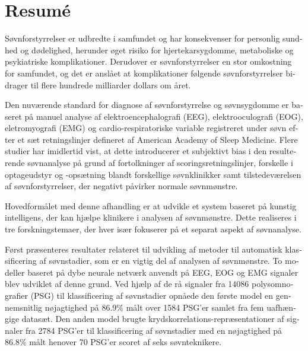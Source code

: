 \begingroup
\let\clearpage\relax
\let\cleardoublepage\relax
\let\cleardoublepage\relax

\chapter*{Resumé}
\begin{otherlanguage}{danish}

Søvnforstyrrelser er udbredte i samfundet og har konsekvenser for personlig sundhed og dødelighed, herunder øget risiko for hjertekarsygdomme, metaboliske og psykiatriske komplikationer.
Derudover er søvnforstyrrelser en stor omkostning for samfundet, og det er anslået at komplikationer følgende søvnforstyrrelser bidrager til flere hundrede milliarder dollars om året. 

Den nuværende standard for diagnose af søvnforstyrrelse og søvnsygdomme er baseret på manuel analyse af elektroencephalografi (EEG), elektrooculografi (EOG), eletromyografi (EMG) og cardio-respiratoriske variable registreret under søvn efter et sæt retningslinjer defineret af American Academy of Sleep Medicine. 
Flere studier har imidlertid vist, at dette introducerer et subjektivt bias i den resulterende søvnanalyse på grund af fortolkninger af scoringsretningslinjer, forskelle i optageudstyr og -opsætning blandt forskellige søvnklinikker samt tilstedeværelsen af søvnforstyrrelser, der negativt påvirker normale søvnmønstre.

Hovedformålet med denne afhandling er at udvikle et system baseret på kunstig intelligens, der kan hjælpe klinikere i analysen af søvnmønstre. Dette realiseres i tre forskningstemaer, der hver især fokuserer på et separat aspekt af søvnanalyse.

Først præsenteres resultater relateret til udvikling af metoder til automatisk klassificering af søvnstadier, som er en vigtig del af analysen af søvnmønstre.
To modeller baseret på dybe neurale netværk anvendt på EEG, EOG og EMG signaler blev udviklet af denne grund.
Ved hjælp af de rå signaler fra 14086 polysomnografier (PSG) til klassificering af søvnstadier opnåede den første model en gennemsnitlig nøjagtighed på 86.9\% målt over 1584 PSG'er samlet fra fem uafhængige datasæt.
Den anden model brugte krydskorrelations-repræsentationer af signaler fra 2784 PSG'er til klassificering af søvnstadier med en nøjagtighed på 86.8\% målt henover 70 PSG'er scoret af seks søvnteknikere.


\end{otherlanguage}
